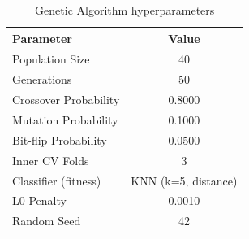 \begin{table}[htbp]
\centering
\caption{Genetic Algorithm hyperparameters}
\label{tab:t6_params}
\begin{tabular}{lc}
\toprule
Parameter & Value \\
\midrule
Population Size & 40 \\
Generations & 50 \\
Crossover Probability & 0.8000 \\
Mutation Probability & 0.1000 \\
Bit-flip Probability & 0.0500 \\
Inner CV Folds & 3 \\
Classifier (fitness) & KNN (k=5, distance) \\
L0 Penalty & 0.0010 \\
Random Seed & 42 \\
\bottomrule
\end{tabular}
\end{table}